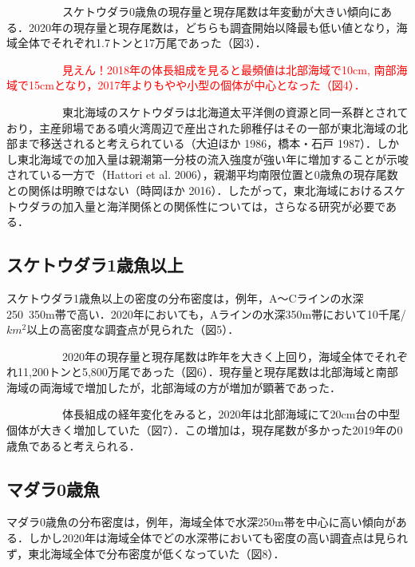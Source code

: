 \documentclass[11pt]{article} %
\begin{document}
\begin{linenumbers}
\ \ \ \ \ \ \ \ \ \ 
スケトウダラ0歳魚の現存量と現存尾数は年変動が大きい傾向にある．2020年の現存量と現存尾数は，どちらも調査開始以降最も低い値となり，海域全体でそれぞれ1.7トンと17万尾であった（図3）．

\ \ \ \ \ \ \ \ \ \ 
\textcolor{red}{見えん！2018年の体長組成を見ると最頻値は北部海域で10cm, 南部海域で15cmとなり，2017年よりもやや小型の個体が中心となった（図4）．}

\ \ \ \ \ \ \ \ \ \ 
東北海域のスケトウダラは北海道太平洋側の資源と同一系群とされており，主産卵場である噴火湾周辺で産出された卵稚仔はその一部が東北海域の北部まで移送されると考えられている（大迫ほか 1986，橋本・石戸 1987）．しかし東北海域での加入量は親潮第一分枝の流入強度が強い年に増加することが示唆されている一方で（Hattori et al. 2006），親潮平均南限位置と0歳魚の現存尾数との関係は明瞭ではない（時岡ほか 2016）．したがって，東北海域におけるスケトウダラの加入量と海洋関係との関係性については，さらなる研究が必要である．

\subsection{スケトウダラ1歳魚以上}
スケトウダラ1歳魚以上の密度の分布密度は，例年，A〜Cラインの水深250~350m帯で高い．2020年においても，Aラインの水深350m帯において10千尾/$km^2$以上の高密度な調査点が見られた（図5）．

\ \ \ \ \ \ \ \ \ \ 
2020年の現存量と現存尾数は昨年を大きく上回り，海域全体でそれぞれ11,200トンと5,800万尾であった（図6）．現存量と現存尾数は北部海域と南部海域の両海域で増加したが，北部海域の方が増加が顕著であった．

\ \ \ \ \ \ \ \ \ \ 
体長組成の経年変化をみると，2020年は北部海域にて20cm台の中型個体が大きく増加していた（図7）．この増加は，現存尾数が多かった2019年の0歳魚であると考えられる．


\subsection{マダラ0歳魚}
マダラ0歳魚の分布密度は，例年，海域全体で水深250m帯を中心に高い傾向がある．しかし2020年は海域全体でどの水深帯においても密度の高い調査点は見られず，東北海域全体で分布密度が低くなっていた（図8）．


\end{linenumbers}
\end{document}
